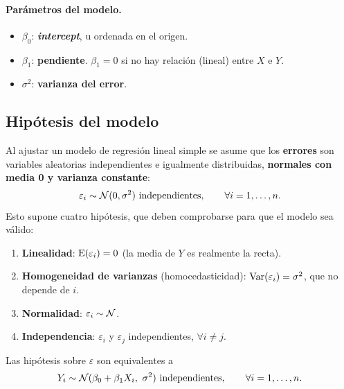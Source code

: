 \paragraph{Parámetros del modelo.}
\begin{itemize}
  \item $\beta_0$: \textbf{\emph{intercept}}, u ordenada en el origen.
  \item $\beta_1$: \textbf{pendiente}. $\beta_1=0$ si no hay relación (lineal) entre $X$ e $Y$.
  \item $\sigma^2$: \textbf{varianza del error}.
\end{itemize}

\subsection{Hipótesis del modelo}
\label{sec:t2-hipotesis}

Al ajustar un modelo de regresión lineal simple se asume que los \textbf{errores} son variables
aleatorias independientes e igualmente distribuidas, \textbf{normales con media 0 y varianza
constante}:
\[
  \varepsilon_i \sim \mathcal{N}(0,\sigma^2) \ \text{independientes}, \qquad \forall i=1,\ldots,n.
\]
Esto supone cuatro hipótesis, que deben comprobarse para que el modelo sea válido:
\begin{enumerate}
  \item \textbf{Linealidad}: $\operatorname{E}(\varepsilon_i)=0$ (la media de $Y$ es realmente la recta).
  \item \textbf{Homogeneidad de varianzas} (homocedasticidad): $\operatorname{Var}(\varepsilon_i)=\sigma^2$,
    que no depende de $i$.
  \item \textbf{Normalidad}: $\varepsilon_i \sim \mathcal{N}$.
  \item \textbf{Independencia}: $\varepsilon_i$ y $\varepsilon_j$ independientes,
    $\forall i\neq j$.
\end{enumerate}

\begin{proposicion}
  Las hipótesis sobre $\varepsilon$ son equivalentes a
  \[
    Y_i \sim \mathcal{N}(\beta_0+\beta_1X_i,\ \sigma^2) \ \text{independientes},
    \qquad \forall i=1,\ldots,n .
  \]
\end{proposicion}

